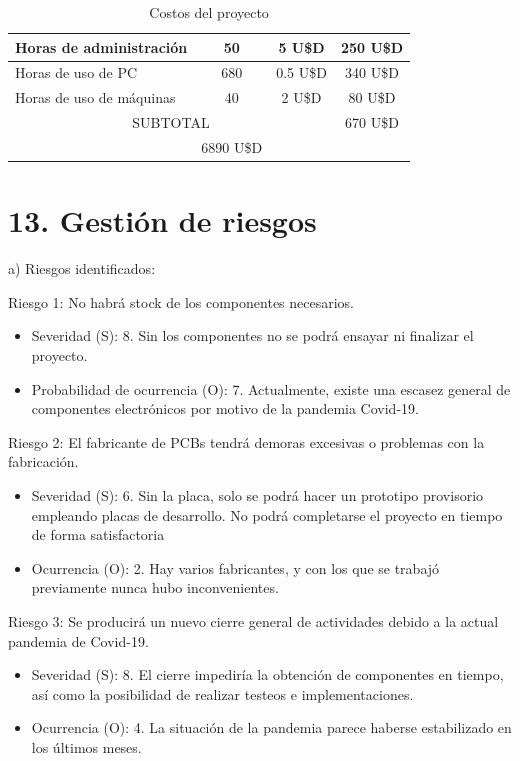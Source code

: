 \documentclass[
11pt, %
]{charter}
\begin{document}
\begin{table}[htpb]
\begin{tabularx}{\linewidth}{@{}|X|c|r|r|@{}}
Horas de administración &
  \multicolumn{1}{c|}{50} &
  \multicolumn{1}{c|}{5 U\$D} &
  \multicolumn{1}{c|}{250 U\$D} \\ \hline 

Horas de uso de PC &
  \multicolumn{1}{c|}{680} &
  \multicolumn{1}{c|}{0.5 U\$D} &
  \multicolumn{1}{c|}{340 U\$D} \\ \hline 
  
Horas de uso de máquinas &
  \multicolumn{1}{c|}{40} &
  \multicolumn{1}{c|}{2 U\$D} &
  \multicolumn{1}{c|}{80 U\$D} \\ \hline 

\multicolumn{3}{|c|}{SUBTOTAL} &
  \multicolumn{1}{c|}{670 U\$D} \\ \hline
\rowcolor[HTML]{C0C0C0}
\multicolumn{3}{|c|}{TOTAL} &
\multicolumn{1}{c|}{6890 U\$D}
   \\ \hline
\end{tabularx}%
\caption{Costos del proyecto}
\label{tab:costosProyecto}
\end{table}


\section{13. Gestión de riesgos}
\label{sec:riesgos}

a) Riesgos identificados:

Riesgo 1: No habrá stock de los componentes necesarios.
\begin{itemize}
	\item Severidad (S): 8. Sin los componentes no se podrá ensayar ni finalizar el proyecto.
	\item Probabilidad de ocurrencia (O): 7. Actualmente, existe una escasez general de componentes electrónicos por motivo de la pandemia Covid-19. 
\end{itemize}   

Riesgo 2: El fabricante de PCBs tendrá demoras excesivas o problemas con la fabricación.
\begin{itemize}
	\item Severidad (S): 6. Sin la placa, solo se podrá hacer un prototipo provisorio empleando placas de desarrollo. No podrá completarse el proyecto en tiempo de forma satisfactoria
	\item Ocurrencia (O): 2. Hay varios fabricantes, y con los que se trabajó previamente nunca hubo inconvenientes.
\end{itemize}

Riesgo 3: Se producirá un nuevo cierre general de actividades debido a la actual pandemia de Covid-19.
\begin{itemize}
	\item Severidad (S): 8. El cierre impediría la obtención de componentes en tiempo, así como la posibilidad de realizar testeos e implementaciones.
	\item Ocurrencia (O): 4. La situación de la pandemia parece haberse estabilizado en los últimos meses.
\end{itemize}
\end{document}
